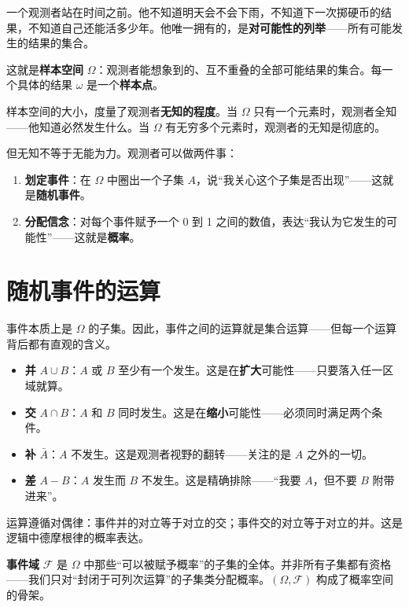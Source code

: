 \documentclass[
]{book}
\providecommand{\tightlist}{%
  \setlength{\itemsep}{0pt}\setlength{\parskip}{0pt}}
\begin{document}
一个观测者站在时间之前。他不知道明天会不会下雨，不知道下一次掷硬币的结果，不知道自己还能活多少年。他唯一拥有的，是\textbf{对可能性的列举}------所有可能发生的结果的集合。

这就是\textbf{样本空间} \(\Omega\)：观测者能想象到的、互不重叠的全部可能结果的集合。每一个具体的结果 \(\omega\) 是一个\textbf{样本点}。

样本空间的大小，度量了观测者\textbf{无知的程度}。当 \(\Omega\) 只有一个元素时，观测者全知------他知道必然发生什么。当 \(\Omega\) 有无穷多个元素时，观测者的无知是彻底的。

但无知不等于无能为力。观测者可以做两件事：

\begin{enumerate}
\def\labelenumi{\arabic{enumi}.}
\tightlist
\item
  \textbf{划定事件}：在 \(\Omega\) 中圈出一个子集 \(A\)，说``我关心这个子集是否出现''------这就是\textbf{随机事件}。
\item
  \textbf{分配信念}：对每个事件赋予一个 0 到 1 之间的数值，表达``我认为它发生的可能性''------这就是\textbf{概率}。
\end{enumerate}

\section{随机事件的运算}\label{ux968fux673aux4e8bux4ef6ux7684ux8fd0ux7b97}

事件本质上是 \(\Omega\) 的子集。因此，事件之间的运算就是集合运算------但每一个运算背后都有直观的含义。

\begin{itemize}
\tightlist
\item
  \textbf{并} \(A \cup B\)：\(A\) 或 \(B\) 至少有一个发生。这是在\textbf{扩大}可能性------只要落入任一区域就算。
\item
  \textbf{交} \(A \cap B\)：\(A\) 和 \(B\) 同时发生。这是在\textbf{缩小}可能性------必须同时满足两个条件。
\item
  \textbf{补} \(\bar{A}\)：\(A\) 不发生。这是观测者视野的翻转------关注的是 \(A\) 之外的一切。
\item
  \textbf{差} \(A - B\)：\(A\) 发生而 \(B\) 不发生。这是精确排除------``我要 \(A\)，但不要 \(B\) 附带进来''。
\end{itemize}

运算遵循对偶律：事件并的对立等于对立的交；事件交的对立等于对立的并。这是逻辑中德摩根律的概率表达。

\textbf{事件域} \(\mathcal{F}\) 是 \(\Omega\) 中那些``可以被赋予概率''的子集的全体。并非所有子集都有资格------我们只对``封闭于可列次运算''的子集类分配概率。\((\Omega, \mathcal{F})\) 构成了概率空间的骨架。
\end{document}
